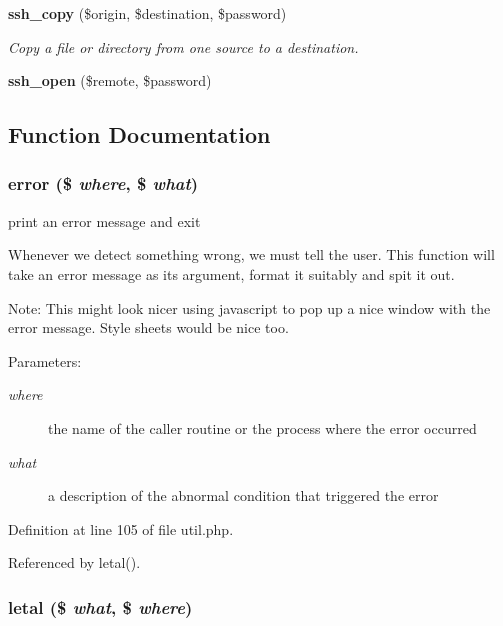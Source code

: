 \begin{CompactItemize}
{\bf ssh\_\-copy} (\$origin, \$destination, \$password)
\begin{CompactList}\small\item\em Copy a file or directory from one source to a destination. \item\end{CompactList}\item 
{\bf ssh\_\-open} (\$remote, \$password)
\end{CompactItemize}


\subsection{Function Documentation}
\subsubsection{\setlength{\rightskip}{0pt plus 5cm}error (\$ {\em where}, \$ {\em what})}\label{util_8php_a3}


print an error message and exit 

Whenever we detect something wrong, we must tell the user. This function will take an error message as its argument, format it suitably and spit it out.

\begin{Desc}
\item[Note:]This might look nicer using javascript to pop up a nice window with the error message. Style sheets would be nice too.\end{Desc}
\begin{Desc}
\item[Parameters:]
\begin{description}
\item[{\em where}]the name of the caller routine or the process where the error occurred \item[{\em what}]a description of the abnormal condition that triggered the error \end{description}
\end{Desc}


Definition at line 105 of file util.php.

Referenced by letal().
\subsubsection{\setlength{\rightskip}{0pt plus 5cm}letal (\$ {\em what}, \$ {\em where})}\label{util_8php_a4}


